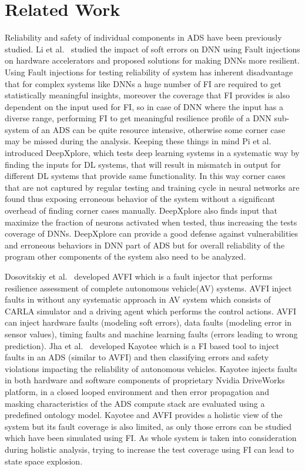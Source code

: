 \section{Related Work}
Reliability and safety of individual components in ADS have been previously studied. Li et al.~\cite{guanpeng17sc} studied the impact of soft errors on DNN using Fault injections on hardware accelerators and proposed solutions for making DNNs more resilient. Using Fault injections for testing reliability of system has inherent disadvantage that for complex systems like DNNs a huge number of FI are required to get statistically meaningful insights, moreover the coverage that FI provides is also dependent on the input used for FI, so in case of DNN where the input has a diverse range, performing FI to get meaningful resilience profile of a DNN sub-system of an ADS can be quite resource intensive, otherwise some corner case may be missed during the analysis. Keeping these things in mind Pi et al.~\cite{kexin17sosp} introduced DeepXplore, which tests deep learning systems in a systematic way by finding the inputs for DL systems, that will result in mismatch in output for different DL systems that provide same functionality. In this way corner cases that are not captured by regular testing and training cycle in neural networks are found thus exposing erroneous behavior of the system without a significant overhead of finding corner cases manually. DeepXplore also finds input that maximize the fraction of neurons activated when tested, thus increasing the tests coverage of DNNs. DeepXplore can provide a good defense against vulnerabilities and erroneous behaviors in DNN part of ADS but for overall reliability of the program other components of the system also need to be analyzed.

Dosovitskiy et al.~\cite{avfi} developed AVFI which is a fault injector that performs resilience assessment of complete autonomous vehicle(AV) systems. AVFI inject faults in without any systematic approach in AV system which consists of CARLA simulator and a driving agent which performs the control actions. AVFI can inject hardware faults (modeling soft errors), data faults (modeling error in sensor values), timing faults and machine learning faults (errors leading to wrong prediction).
Jha et al.~\cite{jha18art} developed Kayotee which is a FI based tool to inject faults in an ADS (similar to AVFI) and then classifying errors and safety violations impacting the reliability of autonomous vehicles. Kayotee injects faults in both hardware and software components of proprietary Nvidia DriveWorks platform, in a closed looped environment and then error propagation and masking characteristics of the ADS compute stack are evaluated using a predefined ontology model.
Kayotee and AVFI provides a holistic view of the system but its  fault coverage is also limited, as only those errors can be studied which have been simulated using FI.
As whole system is taken into consideration during holistic analysis, trying to increase the test coverage using FI 
can lead to state space explosion.

